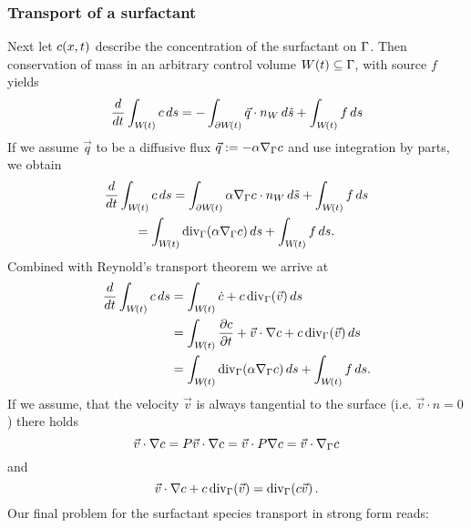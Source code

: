 \subsubsection{Transport of a surfactant}
Next let $c\!\left(x,t\right)$ describe the concentration of the surfactant on $\Gamma$. Then conservation of mass in an arbitrary control volume $W\!\left(t\right)\subseteq\Gamma$, with source $f$ yields
\begin{equation}
	\frac{d}{dt}\int_{W\!\left(t\right)}c\,ds=-\int_{\partial W\!\left(t\right)}\vec q\cdot n_W \,d\tilde s+\int_{W\!\left(t\right)}f\,ds
\end{equation}
If we assume $\vec q$ to be a diffusive flux $\vec q:=-\alpha \nabla_\Gamma c$ and use integration by parts, we obtain
\begin{multline}
	\frac{d}{dt}\int_{W\!\left(t\right)}c\,ds=\int_{\partial W\!\left(t\right)}\alpha \nabla_\Gamma c\cdot n_W \,d \tilde s +\int_{W\!\left(t\right)}f\,ds\\= \int_{W\!\left(t\right)}\mathrm{div}_\Gamma\!\left(\alpha\nabla_\Gamma c\right)ds+\int_{W\!\left(t\right)}f\,ds.
\end{multline}
Combined with Reynold's transport theorem we arrive at
\begin{align}
	\frac{d}{dt}\int_{W\of{t}}c\,ds&=\int_{W\of{t}}\dot c+c\,\mathrm{div}_\boundary\of{\vec v}ds\\
	&=\int_{W\of{t}}\frac{\partial c}{\partial t}+\vec v\cdot\nabla c+c\,\mathrm{div}_\boundary\of{\vec v}ds\\
	&=\int_{W\of{t}}\mathrm{div}_\boundary\of{\alpha\nabla_\boundary c}ds+\int_{W\of{t}}f\,ds.
\end{align}
If we assume, that the velocity $\vec v$ is always tangential to the surface (i.e. $\vec v \cdot n = 0$) there holds
\begin{equation}
	\vec v\cdot\nabla c =P\vec v\cdot\nabla c =\vec v\cdot P\nabla c =\vec v\cdot \nabla_\Gamma c
\end{equation}
and
\begin{equation}
	\vec v\cdot\nabla c+c\,\mathrm{div}_\Gamma\!\left(\vec v\right)=\mathrm{div}_\Gamma\!\left(c \vec v\right).
\end{equation}
Our final problem for the surfactant species transport in strong form reads:
